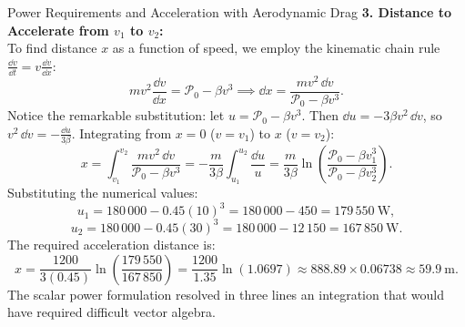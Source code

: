 \begin{workedexample}{Power Requirements and Acceleration with Aerodynamic Drag}
\textbf{3. Distance to Accelerate from $v_1$ to $v_2$:}\\
To find distance $x$ as a function of speed, we employ the kinematic chain rule $\frac{\dd v}{\dd t} = v\frac{\dd v}{\dd x}$:
\[
mv^2 \frac{\dd v}{\dd x} = \mathcal{P}_0 - \beta v^3 \implies \dd x = \frac{m v^2\,\dd v}{\mathcal{P}_0 - \beta v^3}.
\]
Notice the remarkable substitution: let $u = \mathcal{P}_0 - \beta v^3$. Then $\dd u = -3\beta v^2\,\dd v$, so $v^2\,\dd v = -\frac{\dd u}{3\beta}$.
Integrating from $x = 0$ ($v = v_1$) to $x$ ($v = v_2$):
\[
x = \int_{v_1}^{v_2} \frac{m v^2\,\dd v}{\mathcal{P}_0 - \beta v^3} = -\frac{m}{3\beta} \int_{u_1}^{u_2} \frac{\dd u}{u} = \frac{m}{3\beta} \ln\left( \frac{\mathcal{P}_0 - \beta v_1^3}{\mathcal{P}_0 - \beta v_2^3} \right).
\]
Substituting the numerical values:
\[
u_1 = 180\,000 - 0.45(10)^3 = 180\,000 - 450 = 179\,550\ \mathrm{W},
\]
\[
u_2 = 180\,000 - 0.45(30)^3 = 180\,000 - 12\,150 = 167\,850\ \mathrm{W}.
\]
The required acceleration distance is:
\[
x = \frac{1200}{3(0.45)} \ln\left(\frac{179\,550}{167\,850}\right) = \frac{1200}{1.35} \ln(1.0697) \approx 888.89 \times 0.06738 \approx 59.9\ \mathrm{m}.
\]
The scalar power formulation resolved in three lines an integration that would have required difficult vector algebra.
\end{workedexample}
